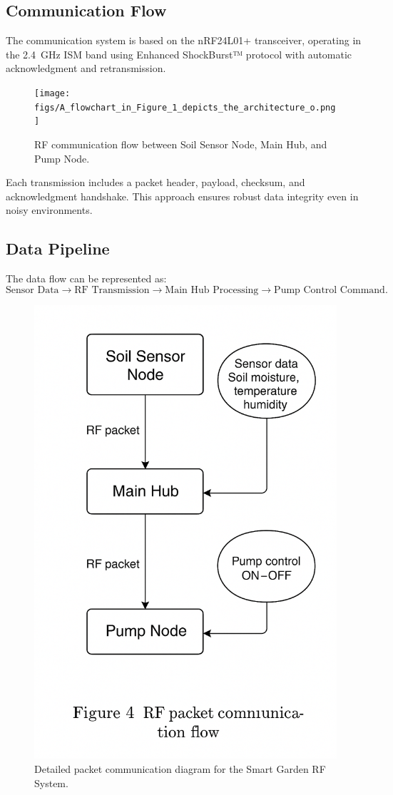 \documentclass[12pt,a4paper]{article}
\begin{document}
\subsection{Communication Flow}
The communication system is based on the nRF24L01+ transceiver, operating in the 2.4~GHz ISM band using Enhanced ShockBurst™ protocol with automatic acknowledgment and retransmission.

\begin{figure}[H]\centering
\texttt{[image: figs/A\_flowchart\_in\_Figure\_1\_depicts\_the\_architecture\_o.png]}
\caption{RF communication flow between Soil Sensor Node, Main Hub, and Pump Node.}
\end{figure}

Each transmission includes a packet header, payload, checksum, and acknowledgment handshake. This approach ensures robust data integrity even in noisy environments.

\subsection{Data Pipeline}
The data flow can be represented as:
\[
\text{Sensor Data} \rightarrow \text{RF Transmission} \rightarrow \text{Main Hub Processing} \rightarrow \text{Pump Control Command}.
\]

\begin{figure}[H]\centering
\includegraphics[width=0.9\linewidth]{figs/rf_flow.png}
\caption{Detailed packet communication diagram for the Smart Garden RF System.}
\end{figure}
\end{document}
